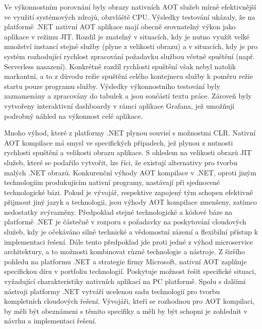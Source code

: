 Ve výkonnostním porovnání byly obrazy nativních AOT služeb mírně efektivnější ve využití systémových zdrojů, obzvláště CPU. Výsledky testování ukázaly, že na platformě .NET nativní AOT aplikace mají obecně srovnatelný výkon jako aplikace v režimu JIT. Rozdíl je znatelný v situacích, kdy je nutno využít velké množství instancí stejné služby (plyne z velikosti obrazu) a v situacích, kdy je pro systém rozhodující rychlost zpracování požadavku službou včetně spuštění (např. Serverless nasazení). Konkrétně rozdíl rychlosti spuštění však nebyl natolik markantní, a to z důvodu režie spuštění celého kontejneru služby k poměru režie startu pouze programu služby. Výsledky výkonnostního testování byly zaznamenány a zpracovány do tabulek a jsou součástí textu práce. Zároveň byly vytvořeny interaktivní dashboardy v rámci aplikace Grafana, jež umožňují podrobný náhled na výkonnost celé aplikace. 

Mnoho výhod, které z platformy .NET plynou souvisí s možnostmi CLR. Nativní AOT kompilace má smysl ve specifických případech, jež plynou z nutnosti rychlosti spuštění a velikosti obrazu aplikace. S ohledem na velikosti obrazů JIT služeb, které se podařilo vytvořit, lze říci, že existují alternativy pro tvorbu malých .NET obrazů. Konkurenční výhody AOT kompilace v .NET, oproti jiným technologiím produkujícím nativní programy, nastávají při sjednocené technologické bázi. Pokud je vývojář, respektive zapojený tým schopen efektivně přijmout jiný jazyk a technologii, jsou výhody AOT kompilace zmenšeny, zatímco nedostatky zvýrazněny. Předpoklad stejné technologické a kódové báze na platformě .NET je částečně v rozporu s požadavky na poskytování cloudových služeb, kdy je očekáváno silné technické a vědomostní zázemí a flexibilní přístup k implementaci řešení. Dále tento předpoklad jde proti jedné z výhod microservice architektury, a to možnosti kombinovat různé technologie a nástroje. Z širšího pohledu na platformu .NET a strategie firmy Microsoft, nativní AOT zaplňuje specifickou díru v portfoliu technologií. Poskytuje možnost řešit specifické situaci, vyžadující charakteristiky nativních aplikací na PC platformě. Spolu s dalšími nástroji platformy .NET vytváří ucelenou sadu technologií pro tvorbu kompletních cloudových řešení. Vývojáři, kteří se rozhodnou pro AOT kompilaci, by měli být obeznámeni s těmito specifiky a měli by být schopni je zohlednit v návrhu a implementaci řešení.

